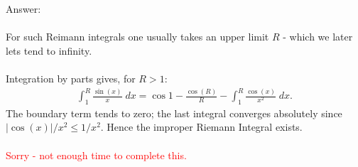 \documentclass[12pt,a4paper]{article}
\begin{document}
\vspace{1cm}
\noindent
Answer:\\
\\
For such Reimann integrals one usually takes an upper limit $R$ - which we later lets tend to infinity.\\
\\
Integration by parts gives, for $R > 1$:
\begin{align*}
\int_1^R\frac{\sin(x)}{x} \; dx
=\cos 1-\frac{\cos(R)}{R}-\int_1^R\frac{\cos(x)}{x^2} \; dx.
\end{align*}
The boundary term tends to zero; the last integral converges absolutely since $|\cos(x)|/x^2 \le 1/x^2$. Hence the improper Riemann Integral exists.\\
\\
\textcolor{red}{Sorry - not enough time to complete this.}
\end{document}
